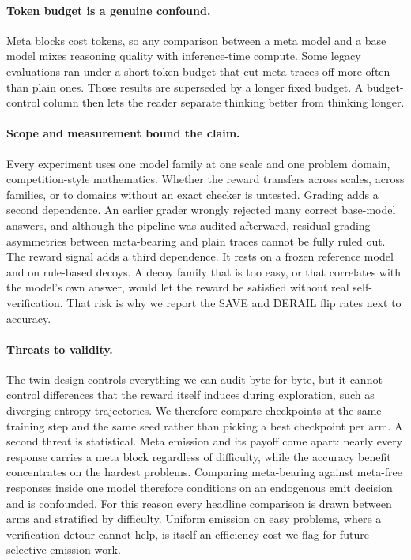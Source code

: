 \paragraph{Token budget is a genuine confound.}
Meta blocks cost tokens, so any comparison between a meta model and a base model
mixes reasoning quality with inference-time compute. Some legacy evaluations ran
under a short token budget that cut meta traces off more often than plain ones.
Those results are superseded by a longer fixed budget. A budget-control column
then lets the reader separate thinking better from thinking longer.

\paragraph{Scope and measurement bound the claim.}
Every experiment uses one model family at one scale and one problem domain,
competition-style mathematics. Whether the reward transfers across scales,
across families, or to domains without an exact checker is untested. Grading
adds a second dependence. An earlier grader wrongly rejected many correct
base-model answers, and although the pipeline was audited afterward, residual
grading asymmetries between meta-bearing and plain traces cannot be fully ruled
out. The reward signal adds a third dependence. It rests on a frozen reference
model and on rule-based decoys. A decoy family that is too easy, or that
correlates with the model's own answer, would let the reward be satisfied
without real self-verification. That risk is why we report the SAVE and DERAIL
flip rates next to accuracy.

\paragraph{Threats to validity.}
The twin design controls everything we can audit byte for byte, but it cannot
control differences that the reward itself induces during exploration, such as
diverging entropy trajectories. We therefore compare checkpoints at the same
training step and the same seed rather than picking a best checkpoint per arm. A
second threat is statistical. Meta emission and its payoff come apart: nearly
every response carries a meta block regardless of difficulty, while the accuracy
benefit concentrates on the hardest problems. Comparing meta-bearing against
meta-free responses inside one model therefore conditions on an endogenous emit
decision and is confounded. For this reason every headline comparison is drawn
between arms and stratified by difficulty. Uniform emission on easy problems,
where a verification detour cannot help, is itself an efficiency cost we flag for
future selective-emission work.

